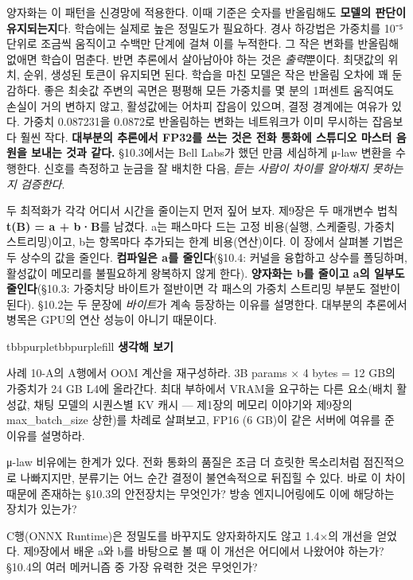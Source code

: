 양자화는 이 패턴을 신경망에 적용한다. 이때 기준은 숫자를 반올림해도 \textbf{모델의 판단이 유지되는지}다. 학습에는 실제로 높은 정밀도가 필요하다. 경사 하강법은 가중치를 10⁻⁵ 단위로 조금씩 움직이고 수백만 단계에 걸쳐 이를 누적한다. 그 작은 변화를 반올림해 없애면 학습이 멈춘다. 반면 추론에서 살아남아야 하는 것은 \textit{출력}뿐이다. 최댓값의 위치, 순위, 생성된 토큰이 유지되면 된다. 학습을 마친 모델은 작은 반올림 오차에 꽤 둔감하다. 좋은 최솟값 주변의 곡면은 평평해 모든 가중치를 몇 분의 1퍼센트 움직여도 손실이 거의 변하지 않고, 활성값에는 어차피 잡음이 있으며, 결정 경계에는 여유가 있다. 가중치 0.087231을 0.0872로 반올림하는 변화는 네트워크가 이미 무시하는 잡음보다 훨씬 작다. \textbf{대부분의 추론에서 FP32를 쓰는 것은 전화 통화에 스튜디오 마스터 음원을 보내는 것과 같다.} §10.3에서는 Bell Labs가 했던 만큼 세심하게 μ-law 변환을 수행한다. 신호를 측정하고 눈금을 잘 배치한 다음, \textit{듣는 사람이 차이를 알아채지 못하는지 검증한다}.

두 최적화가 각각 어디서 시간을 줄이는지 먼저 짚어 보자. 제9장은 두 매개변수 법칙 \textbf{t(B) = a + b·B}를 남겼다. a는 패스마다 드는 고정 비용(실행, 스케줄링, 가중치 스트리밍)이고, b는 항목마다 추가되는 한계 비용(연산)이다. 이 장에서 살펴볼 기법은 두 상수의 값을 줄인다. \textbf{컴파일은 a를 줄인다}(§10.4: 커널을 융합하고 상수를 폴딩하며, 활성값이 메모리를 불필요하게 왕복하지 않게 한다). \textbf{양자화는 b를 줄이고 a의 일부도 줄인다}(§10.3: 가중치당 바이트가 절반이면 각 패스의 가중치 스트리밍 부분도 절반이 된다). §10.2는 두 문장에 \textit{바이트}가 계속 등장하는 이유를 설명한다. 대부분의 추론에서 병목은 GPU의 연산 성능이 아니기 때문이다.

\begin{calloutbox}{tbbpurple}{tbbpurplefill}
{\normalsize\bfseries\color{tbbpurple}생각해 보기}\par\vspace{3pt}
\begin{tbbitemize}
  \item 사례 10-A의 A행에서 OOM 계산을 재구성하라. 3B params × 4 bytes = 12 GB의 가중치가 24 GB L4에 올라간다. 최대 부하에서 VRAM을 요구하는 다른 요소(배치 활성값, 채팅 모델의 시퀀스별 KV 캐시 — 제1장의 메모리 이야기와 제9장의 max\_batch\_size 상한)를 차례로 살펴보고, FP16 (6 GB)이 같은 서버에 여유를 준 이유를 설명하라.
  \item μ-law 비유에는 한계가 있다. 전화 통화의 품질은 조금 더 흐릿한 목소리처럼 점진적으로 나빠지지만, 분류기는 어느 순간 결정이 불연속적으로 뒤집힐 수 있다. 바로 이 차이 때문에 존재하는 §10.3의 안전장치는 무엇인가? 방송 엔지니어링에도 이에 해당하는 장치가 있는가?
  \item C행(ONNX Runtime)은 정밀도를 바꾸지도 양자화하지도 않고 1.4×의 개선을 얻었다. 제9장에서 배운 a와 b를 바탕으로 볼 때 이 개선은 어디에서 나왔어야 하는가? §10.4의 여러 메커니즘 중 가장 유력한 것은 무엇인가?
\end{tbbitemize}
\end{calloutbox}

